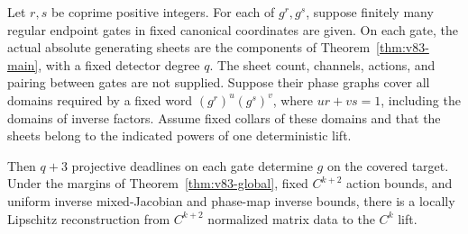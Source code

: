 \begin{theorem}
\label{thm:v83-return}
Let $r,s$ be coprime positive integers. For each of $g^r,g^s$, suppose
finitely many regular endpoint gates in fixed canonical coordinates
are given. On each gate, the actual absolute generating sheets are
the components of Theorem~\ref{thm:v83-main}, with a fixed detector
degree $q$. The sheet count, channels, actions, and pairing between
gates are not supplied. Suppose their phase graphs cover all domains
required by a fixed word $(g^r)^u(g^s)^v$, where $ur+vs=1$,
including the domains of inverse factors. Assume fixed collars of
these domains and that the sheets belong to the indicated powers of
one deterministic lift.

Then $q+3$ projective deadlines on each gate determine $g$ on the
covered target. Under the margins of Theorem~\ref{thm:v83-global},
fixed $C^{k+2}$ action bounds, and uniform inverse mixed-Jacobian and
phase-map inverse bounds, there is a locally Lipschitz reconstruction
from $C^{k+2}$ normalized matrix data to the $C^k$ lift.
\end{theorem}
